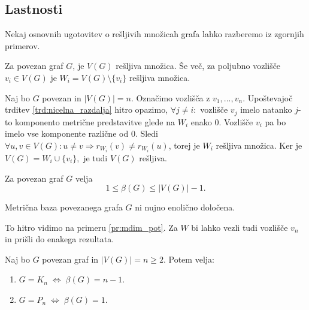 \documentclass[mat1, tisk]{fmfdelo}
\begin{document}
\subsection{Lastnosti} \label{s:lastnosti_mdim}

Nekaj osnovnih ugotovitev o rešljivih množicah grafa lahko razberemo iz zgornjih primerov.

\begin{trditev} \label{trd:cela_resljiva}
Za povezan graf $G$, je $V(G)$ rešljiva množica. Še več, za poljubno vozlišče $v_i \in V(G)$
je $W_i = V(G) \setminus \{ v_i\}$ rešljiva množica.
\end{trditev}

\begin{dokaz}
Naj bo $G$ povezan in $|V(G)|= n$. Označimo vozlišča z $v_1, ..., v_n$.
Upoštevajoč trditev \ref{trd:nicelna_razdalja} hitro opazimo, 
$\forall j \neq i:$ vozlišče $v_j$ imelo natanko $j$-to komponento metrične predstavitve 
glede na $W_i$ enako $0$. Vozlišče $v_i$ pa bo imelo vse komponente različne od $0.$
Sledi $\forall u, v \in V(G): u \neq v \Rightarrow r_{W_i}(v) \neq r_{W_i}(u)$, 
torej je $W_i$ rešljiva množica.
Ker je $V(G) = W_i \cup \{ v_i\},$ je tudi $V(G)$ rešljiva.
\end{dokaz}


\begin{posledica} \label{po:groba_omejitev_mdim}
    Za povezan graf $G$ velja 
    $$1 \leq \beta(G) \leq |V(G)| - 1. $$
\end{posledica}


\begin{trditev} \label{trd:enolicnost_baze}
    Metrična baza povezanega grafa $G$ ni nujno enolično določena.
\end{trditev}

\begin{dokaz}
    To hitro vidimo na primeru \ref{pr:mdim_pot}. Za $W$ bi lahko vezli tudi vozlišče 
    $v_n$ in prišli do enakega rezultata.
\end{dokaz}




\begin{trditev} \label{trd:mdim_polni_pot}
    Naj bo $G$ povezan graf in $|V(G)| = n \geq 2.$ Potem velja:
    \begin{enumerate}
        \item $G = K_n \; \Leftrightarrow \; \beta(G) = n - 1.$
        \item $G = P_n \; \Leftrightarrow \; \beta(G) = 1.$
    \end{enumerate} 
\end{trditev}
\end{document}
